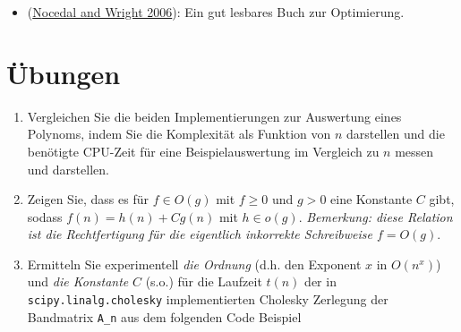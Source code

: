 \documentclass[
]{book}
\providecommand{\tightlist}{%
  \setlength{\itemsep}{0pt}\setlength{\parskip}{0pt}}
\theoremstyle{definition}
\theoremstyle{definition}
\theoremstyle{definition}
\theoremstyle{definition}
\theoremstyle{remark}
\begin{document}
\begin{itemize}
\tightlist
\item
  (\protect\hyperlink{ref-NocW06}{Nocedal and Wright 2006}): Ein gut lesbares Buch zur Optimierung.
\end{itemize}

\hypertarget{uxfcbungen}{%
\section{Übungen}\label{uxfcbungen}}

\begin{enumerate}
\def\labelenumi{\arabic{enumi}.}
\item
  Vergleichen Sie die beiden Implementierungen zur Auswertung eines Polynoms, indem Sie die Komplexität als Funktion von \(n\) darstellen und die benötigte CPU-Zeit für eine Beispielauswertung im Vergleich zu \(n\) messen und darstellen.
\item
  Zeigen Sie, dass es für \(f\in O(g)\) mit \(f\geq 0\) und \(g> 0\) eine Konstante \(C\) gibt, sodass \(f(n)=h(n) + Cg(n)\) mit \(h\in o(g)\). \emph{Bemerkung: diese Relation ist die Rechtfertigung für die eigentlich inkorrekte Schreibweise \(f=O(g)\)}.
\item
  Ermitteln Sie experimentell \emph{die Ordnung} (d.h. den Exponent \(x\) in \(O(n^x)\)) und \emph{die Konstante} \(C\) (s.o.) für die Laufzeit \(t(n)\) der in \texttt{scipy.linalg.cholesky} implementierten Cholesky Zerlegung der Bandmatrix \texttt{A\_n} aus dem folgenden Code Beispiel
\end{enumerate}
\end{document}
